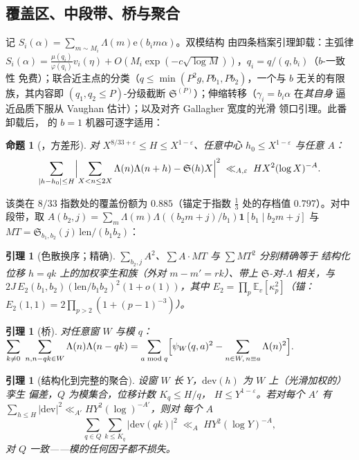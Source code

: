 \documentclass[11pt]{article}
\numberwithin{equation}{section}
\newtheorem{lemma}[theorem]{引理}
\newtheorem{proposition}[theorem]{命题}
\theoremstyle{definition}
\theoremstyle{remark}
\newcommand{\LL}{\Lambda}
\newcommand{\SSS}{\mathfrak{S}}
\newcommand{\e}{\mathrm{e}}
\begin{document}
\subsection{覆盖区、中段带、桥与聚合}\label{s:fm:R}

记 $S_i(\alpha)=\sum_{m\sim M_i}\LL(m)\e(b_im\alpha)$。双模结构
由四条档案引理卸载：主弧律
$S_i(\alpha)=\frac{\mu(q_i)}{\varphi(q_i)}v_i(\eta)
+O(M_i\exp(-c\sqrt{\log M}))$，$q_i=q/(q,b_i)$（$b$-一致性
免费）；联合近主点的分类（$q\le\min(P^2g,Pb_1,Pb_2)$，一个与
$b$ 无关的有限族，其内容即 $(q_1,q_2\le P)$-分级截断
$\SSS^{(P)}$）；伸缩转移（$\gamma_i=b_i\alpha$ 在\emph{其自身}
逼近品质下服从 Vaughan 估计）；以及对齐 Gallagher 宽度的光滑
领口引理。此番卸载后，\cite{MRT} 的 $b=1$ 机器可逐字适用：

\begin{proposition}[{\cite[定理~1.3(i)]{MRT}}，方差形]\label{p:IM}
对 $X^{8/33+\varepsilon}\le H\le X^{1-\varepsilon}$、任意中心
$h_0\le X^{1-\varepsilon}$ 与任意 $A$：
\[
\sum_{|h-h_0|\le H}\Bigl|\sum_{X<n\le2X}\LL(n)\LL(n+h)-\SSS(h)X
\Bigr|^2\;\ll_{A,\varepsilon}\;HX^2(\log X)^{-A}.
\]
\end{proposition}

\noindent 该类在 $8/33$ 指数处的覆盖份额为 $0.885$（锚定于指数
$\tfrac13$ 处的存档值 $0.797$）。对中段带，取
$A(b_2,j)=\sum_m\LL(m)\LL((b_2m+j)/b_1)\mathbf1[b_1\mid b_2m+j]$
与 $MT=\SSS_{b_1,b_2}(j)\,\mathrm{len}/(b_1b_2)$：

\begin{lemma}[色散换序；精确]\label{l:swaps}
$\sum_{b_2,j}A^2$、$\sum A\cdot MT$ 与 $\sum MT^2$ 分别精确等于
结构化位移 $h=qk$ 上的加权孪生和族（外对 $m-m'=rk$）、带上
$\SSS$-对-$\LL$ 相关，与
$2J\,E_2(b_1,b_2)(\mathrm{len}/b_1b_2)^2(1+o(1))$，其中
$E_2=\prod_p\mathbb E_v[\kappa_p^2]$（锚：
$E_2(1,1)=2\prod_{p>2}(1+(p-1)^{-3})$）。
\end{lemma}

\begin{lemma}[桥]\label{l:bridge}
对任意窗 $W$ 与模 $q$：
$\displaystyle\sum_{k\ne0}\ \sum_{n,n-qk\in W}\LL(n)\LL(n-qk)
=\sum_{a\bmod q}\Bigl[\psi_W(q,a)^2-\sum_{n\in W,\,n\equiv a}
\LL(n)^2\Bigr].$
\end{lemma}

\begin{lemma}[结构化到完整的聚合]\label{l:U}
设窗 $W$ 长 $Y$，$\mathrm{dev}(h)$ 为 $W$ 上（光滑加权的）孪生
偏差，$Q$ 为模集合，位移计数 $K_q\le H/q$，
$H\le Y^{1-\varepsilon}$。若对每个 $A'$ 有
$\sum_{h\le H}|\mathrm{dev}|^2\ll_{A'}HY^2(\log)^{-A'}$，则对
每个 $A$
\[
\sum_{q\in Q}\sum_{k\le K_q}|\mathrm{dev}(qk)|^2
\;\ll_A\;HY^2(\log Y)^{-A},
\]
对 $Q$ 一致——模的任何因子都不损失。
\end{lemma}
\end{document}
